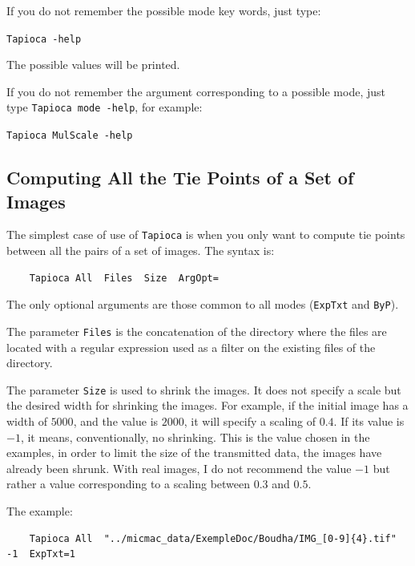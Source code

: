 If you do not remember the possible mode key words, just type:

\begin{center}
	{\tt Tapioca -help}
\end{center}

The possible values will be printed.

If you do not remember the argument
corresponding to a possible mode, just type {\tt Tapioca mode -help},
for example:

\begin{center}
	{\tt Tapioca MulScale -help}
\end{center}




\subsection{Computing All the Tie Points of a Set of Images}

The simplest case of use of {\tt Tapioca} is when you only want to compute tie points
between all the pairs of a set of images. The syntax is:

{\scriptsize
\begin{verbatim}
    Tapioca All  Files  Size  ArgOpt=
\end{verbatim}
}

The only optional arguments are those common to all modes ({\tt ExpTxt}  and {\tt ByP}).

The parameter {\tt Files} is the concatenation of the directory where the files
are located with a regular expression used as a filter on the existing files
of the directory.

The parameter {\tt Size} is used to shrink the images. It does not specify
a scale but the desired width for shrinking the images. For example, if the initial
image has a width of $5000$, and the value is $2000$, it will specify
a scaling of $0.4$. If its value is $-1$, it means, conventionally, no shrinking.
This is the value chosen in the examples, in order  to limit the size of the transmitted
data, the images have already been shrunk. With real images, I do not
recommend the value $-1$ but rather a value corresponding to a scaling
between $0.3$ and $0.5$.


The example:

{\scriptsize
\begin{verbatim}
    Tapioca All  "../micmac_data/ExempleDoc/Boudha/IMG_[0-9]{4}.tif" -1  ExpTxt=1
\end{verbatim}
}

